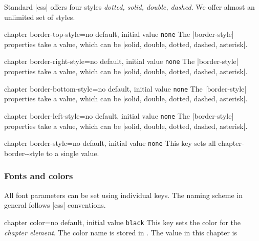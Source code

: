 Standard |css|  offers four styles \emph{dotted, solid, double, dashed}. We offer almost an unlimited set of styles.

\begin{docKey}[phd]{chapter border-top-style}{=}{no default, initial value \texttt{none}}
The |border-style| properties take a value, which can be |solid, double, dotted, dashed, asterisk|.
\end{docKey}

\begin{docKey}[phd]{chapter border-right-style}{=}{no default, initial value \texttt{none}}
The |border-style| properties take a value, which can be |solid, double, dotted, dashed, asterisk|.
\end{docKey}

\begin{docKey}[]{chapter border-bottom-style}{=}{no default, initial value \texttt{none}}
The |border-style| properties take a value, which can be |solid, double, dotted, dashed, asterisk|.
\end{docKey}

\begin{docKey}[]{chapter border-left-style}{=}{no default, initial value \texttt{none}}
The |border-style| properties take a value, which can be |solid, double, dotted, dashed, asterisk|.
\end{docKey}

\begin{docKey}[phd]{chapter border-style}{=}{no default, initial value \texttt{none}}
This key sets all chapter-border--style to a single value.
\end{docKey}

\subsubsection{Fonts and colors}

All font parameters can be set using individual keys. The naming scheme in general follows |css| conventions.

\begin{docKey}[phd]{chapter color}{=}{no default, initial value \texttt{black}}
This key sets the color for the \textit{chapter element}. The color name is stored in \cmd{\chaptercolor@cx}.
The value in this chapter is%
\end{docKey}

